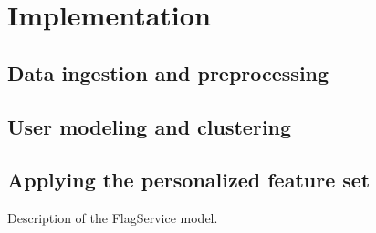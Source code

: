 \chapter{Implementation}

\label{Chapter4}



\section{Data ingestion and preprocessing} %
\label{sec:data_ingestion_and_preprocessing}


\section{User modeling and clustering} %
\label{sec:user_modeling_and_clustering}


\section{Applying the personalized feature set} %
\label{sec:applying_the_personalized_feature_set}

Description of the FlagService model.



